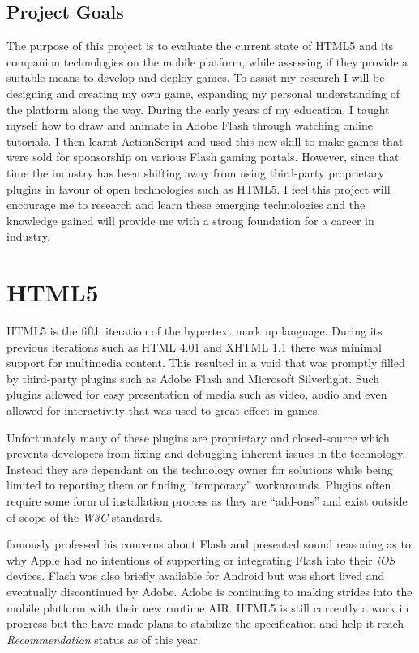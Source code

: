 \documentclass[final]{cmpreport}
\begin{document}
\subsection{Project Goals}
The purpose of this project is to evaluate the current state of HTML5 and its companion technologies on the mobile platform, while assessing if they provide a suitable means to develop and deploy games. To assist my research I will be designing and creating my own game, expanding my personal understanding of the platform along the way. During the early years of my education, I taught myself how to draw and animate in Adobe Flash through watching online tutorials. I then learnt ActionScript and used this new skill to make games that were sold for sponsorship on various Flash gaming portals. However, since that time the industry has been shifting away from using third-party proprietary plugins in favour of open technologies such as HTML5. I feel this project will encourage me to research and learn these emerging technologies and the knowledge gained will provide me with a strong foundation for a career in industry.

\section{HTML5}
HTML5 is the fifth iteration of the hypertext mark up language. During its previous iterations such as HTML 4.01 and XHTML 1.1 there was minimal support for multimedia content. This resulted in a void that was promptly filled by third-party plugins such as Adobe Flash and Microsoft Silverlight. Such plugins allowed for easy presentation of media such as video, audio and even allowed for interactivity that was used to great effect in games.

Unfortunately many of these plugins are proprietary and closed-source which prevents developers from fixing and debugging inherent issues in the technology. Instead they are dependant on the technology owner for solutions while being limited to reporting them or finding ``temporary'' workarounds. Plugins often require some form of installation process as they are ``add-ons'' and exist outside of scope of the \textit{W3C} standards.

\citet{Jobs} famously professed his concerns about Flash and presented sound reasoning as to why Apple had no intentions of supporting or integrating Flash into their \textit{iOS} devices. Flash was also briefly available for Android but was short lived and eventually discontinued by Adobe. Adobe is continuing to making strides into the mobile platform with their new runtime AIR\footnotemark[2]. HTML5 is still currently a work in progress but the \cite{W3C} have made plans to stabilize the specification and help it reach \textit{Recommendation\footnotemark[3]} status as of this year.
\end{document}

